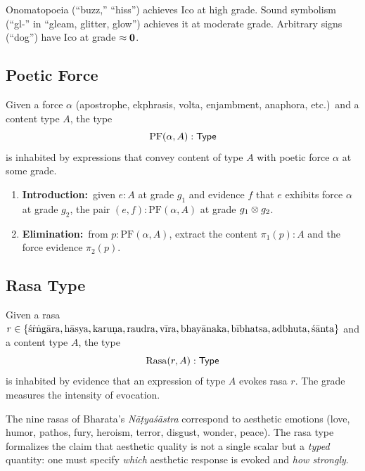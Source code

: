 \begin{example}
Onomatopoeia (``buzz,'' ``hiss'') achieves $\mathrm{Ico}$ at high
grade.  Sound symbolism (``gl-'' in ``gleam, glitter, glow'')
achieves it at moderate grade.  Arbitrary signs (``dog'') have
$\mathrm{Ico}$ at grade $\approx \mathbf{0}$.
\end{example}

\subsection{Poetic Force}
\label{subsec:pf}

\begin{definition}
\label{def:pf}
Given a force $\alpha$ (apostrophe, ekphrasis, volta, enjambment,
anaphora, etc.)\ and a content type $A$, the type
\[
  \mathrm{PF}(\alpha, A) : \mathsf{Type}
\]
is inhabited by expressions that convey content of type $A$ with
poetic force $\alpha$ at some grade.
\begin{enumerate}[label=(\alph*)]
\item \textbf{Introduction:}\ given $e : A$ at grade $g_1$ and
  evidence $f$ that $e$ exhibits force $\alpha$ at grade $g_2$,
  the pair $(e, f) : \mathrm{PF}(\alpha, A)$ at grade
  $g_1 \otimes g_2$.
\item \textbf{Elimination:}\ from $p : \mathrm{PF}(\alpha, A)$,
  extract the content $\pi_1(p) : A$ and the force evidence
  $\pi_2(p)$.
\end{enumerate}
\end{definition}

\subsection{Rasa Type}
\label{subsec:rasa}

\begin{definition}
\label{def:rasa}
Given a rasa $r \in \{\text{\'s\.r\.ng\=ara}, \text{h\=asya},
\text{karu\d{n}a}, \text{raudra}, \text{v\=\i ra},
\text{bhay\=anaka}, \text{b\=\i bhatsa},
\text{adbhuta}, \text{\'s\=anta}\}$
and a content type $A$, the type
\[
  \mathrm{Rasa}(r, A) : \mathsf{Type}
\]
is inhabited by evidence that an expression of type $A$ evokes
rasa $r$.  The grade measures the intensity of evocation.
\end{definition}

\begin{remark}
The nine rasas of Bharata's \emph{N\=a\d{t}ya\'s\=astra} correspond
to aesthetic emotions (love, humor, pathos, fury, heroism, terror,
disgust, wonder, peace).  The rasa type formalizes the claim that
aesthetic quality is not a single scalar but a \emph{typed} quantity:
one must specify \emph{which} aesthetic response is evoked and
\emph{how strongly}.
\end{remark}


